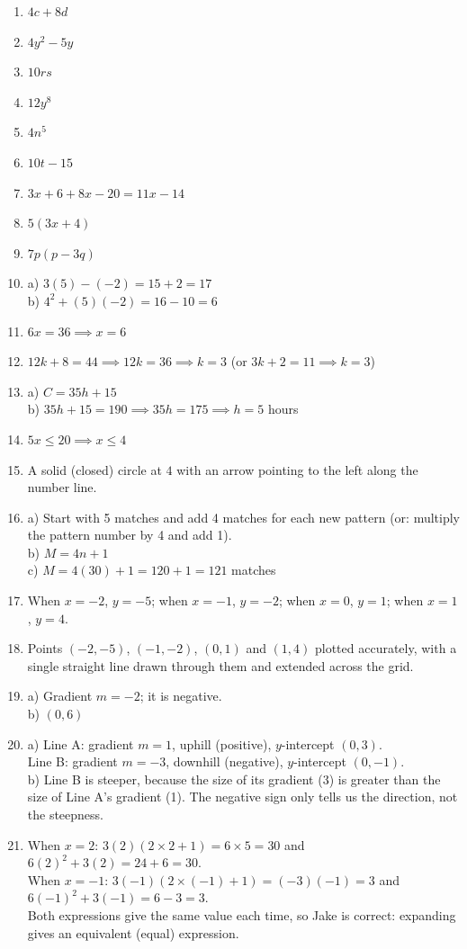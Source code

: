 \documentclass[11pt,a4paper]{article}
\begin{document}
\begin{enumerate}[label=\textbf{\arabic*.}, leftmargin=*, itemsep=4pt]
\item $4c + 8d$
\item $4y^2 - 5y$
\item $10rs$
\item $12y^8$
\item $4n^5$
\item $10t - 15$
\item $3x + 6 + 8x - 20 = 11x - 14$
\item $5(3x + 4)$
\item $7p(p - 3q)$
\item a) $3(5) - (-2) = 15 + 2 = 17$ \\
      b) $4^2 + (5)(-2) = 16 - 10 = 6$
\item $6x = 36 \implies x = 6$
\item $12k + 8 = 44 \implies 12k = 36 \implies k = 3$ \quad (or $3k + 2 = 11 \implies k = 3$)
\item a) $C = 35h + 15$ \\
      b) $35h + 15 = 190 \implies 35h = 175 \implies h = 5$ hours
\item $5x \le 20 \implies x \le 4$
\item A solid (closed) circle at $4$ with an arrow pointing to the left along the number line.
\item a) Start with 5 matches and add 4 matches for each new pattern (or: multiply the pattern number by 4 and add 1). \\
      b) $M = 4n + 1$ \\
      c) $M = 4(30) + 1 = 120 + 1 = 121$ matches
\item When $x = -2$, $y = -5$; when $x = -1$, $y = -2$; when $x = 0$, $y = 1$; when $x = 1$, $y = 4$.
\item Points $(-2, -5)$, $(-1, -2)$, $(0, 1)$ and $(1, 4)$ plotted accurately, with a single straight line drawn through them and extended across the grid.
\item a) Gradient $m = -2$; it is negative. \\
      b) $(0, 6)$
\item a) Line A: gradient $m = 1$, uphill (positive), $y$-intercept $(0, 3)$. \\
      \phantom{a) }Line B: gradient $m = -3$, downhill (negative), $y$-intercept $(0, -1)$. \\
      b) Line B is steeper, because the size of its gradient (3) is greater than the size of Line A's gradient (1). The negative sign only tells us the direction, not the steepness.
\item When $x = 2$: $3(2)(2 \times 2 + 1) = 6 \times 5 = 30$ and $6(2)^2 + 3(2) = 24 + 6 = 30$. \\
      When $x = -1$: $3(-1)(2 \times (-1) + 1) = (-3)(-1) = 3$ and $6(-1)^2 + 3(-1) = 6 - 3 = 3$. \\
      Both expressions give the same value each time, so Jake is correct: expanding gives an equivalent (equal) expression.
\end{enumerate}
\end{document}
